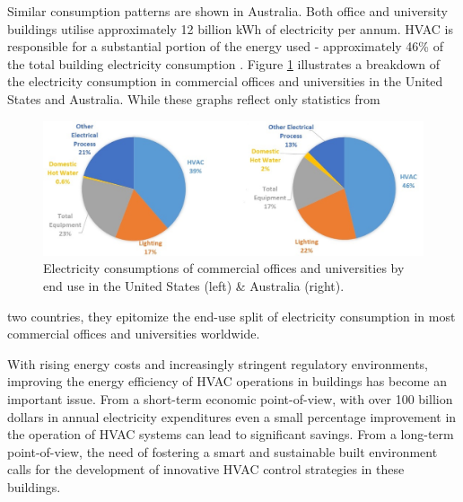 Similar consumption patterns are shown in Australia. %
Both office and university buildings utilise approximately 12 billion kWh of electricity per annum. HVAC is responsible for a substantial portion of the energy used - approximately 46\% of the total building electricity consumption \citep{pitt2012baseline}. Figure \ref{intro:electricity_end_use_split} illustrates a breakdown of the electricity consumption in commercial offices and universities in the United States and Australia. %
While these graphs reflect only statistics from 
\begin{figure}[hb]
\centering
\includegraphics[width=5in,keepaspectratio]{figs/intro_end_use_split.jpg}
\caption{Electricity consumptions of commercial offices and universities by end use in the United States (left) \& Australia (right).}
\label{intro:electricity_end_use_split}
\end{figure}
\noindent two countries, they epitomize the end-use split of electricity consumption in most commercial offices and universities worldwide.

With rising energy costs and increasingly stringent regulatory environments, improving the energy efficiency of HVAC operations in buildings has become an important issue. From a short-term economic point-of-view, with over 100 billion dollars in annual electricity expenditures even a small percentage improvement in the operation of HVAC systems can lead to significant savings. From a long-term point-of-view, the need of fostering a smart and sustainable built environment calls for the development of innovative HVAC control strategies in these buildings. 


